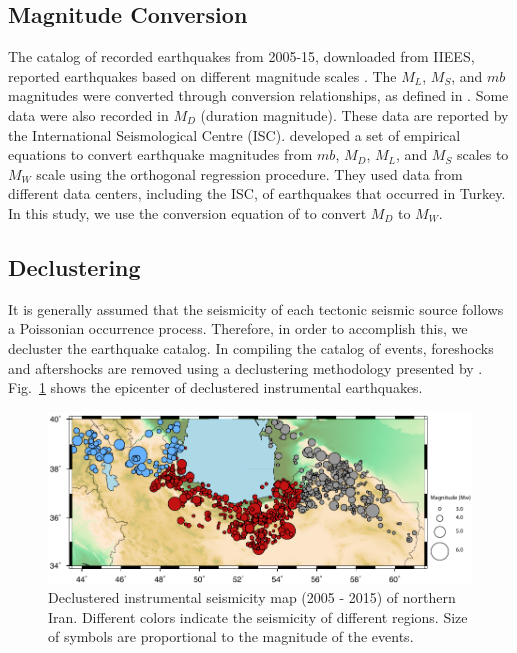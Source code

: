 \subsection{Magnitude Conversion}
\noindent
The catalog of recorded earthquakes from 2005-15, downloaded from IIEES, reported earthquakes based on different magnitude scales \citep{IIEES}. The  $M_L$,  $M_S$, and  $mb$  magnitudes were converted through conversion relationships, as defined in  \citet{Zare2014}. Some data were also recorded in  $M_D$  (duration magnitude). These data are reported by the International Seismological Centre (ISC).   \citet{Deniz2010}  developed a set of empirical equations to convert earthquake magnitudes from  $mb$,  $M_D$,  $M_L$, and  $M_S$  scales to  $M_W$  scale using the orthogonal regression procedure. They used data from different data centers, including the ISC, of earthquakes that occurred in Turkey. In this study, we use the conversion equation of  \citet{Deniz2010}  to convert  $M_D$  to  $M_W$. 

\subsection{Declustering} 
\noindent
It is generally assumed that the seismicity of each tectonic seismic source follows a Poissonian occurrence process. Therefore, in order to accomplish this, we decluster the earthquake catalog. In compiling the catalog of events, foreshocks and aftershocks are removed using a declustering methodology  presented by \citet{Gardner1974}. Fig.~\ref{fig:seismicity}  shows the epicenter of declustered instrumental  earthquakes.

\begin{figure} [ht]
\centering
\includegraphics[scale=1]{figures/pdf/Figure03.pdf} 
\caption{Declustered instrumental seismicity map (2005 - 2015) of northern Iran. Different colors indicate the seismicity of different regions. Size of symbols are proportional to the magnitude of the events.}
\label{fig:seismicity}
\end{figure}



